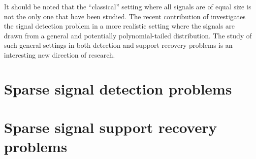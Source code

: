 It should be noted that the ``classical'' setting where all signals are of equal size is not the only one that have been studied. 
The recent contribution of \cite{li2020optimality} investigates the signal detection problem in a more realistic setting where the signals are drawn from a general and potentially polynomial-tailed distribution. 
The study of such general settings in both detection and support recovery problems is an interesting new direction of research.


\section{Sparse signal detection problems}
\label{sec:global-tests}


\section{Sparse signal support recovery problems}
\label{sec:additive-error-model-boundaries}



%




